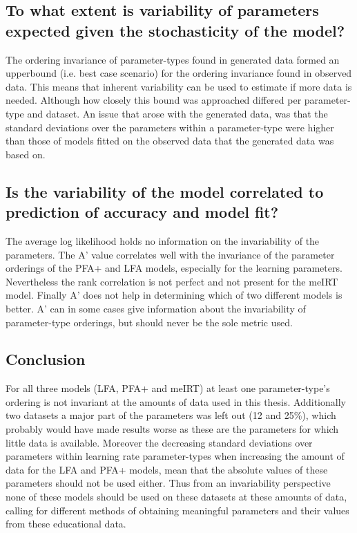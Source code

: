 \documentclass{scrartcl}
\begin{document}
\subsection{To what extent is variability of parameters expected given the stochasticity of the model?}
The ordering invariance of parameter-types found in generated data formed an upperbound (i.e. best case scenario) for the ordering invariance found in observed data. This means that inherent variability can be used to estimate if more data is needed. Although how closely this bound was approached differed per parameter-type and dataset. An issue that arose with the generated data, was that the standard deviations over the parameters within a parameter-type were higher than those of models fitted on the observed data that the generated data was based on. 

\subsection{Is the variability of the model correlated to prediction of accuracy and model fit?}
The average log likelihood holds no information on the invariability of the parameters. The A' value correlates well with the invariance of the parameter orderings of the PFA+ and LFA models, especially for the learning parameters. Nevertheless the rank correlation is not perfect and not present for the meIRT model. Finally A' does not help in determining which of two different models is better. A' can in some cases give information about the invariability of parameter-type orderings, but should never be the sole metric used.

\subsection{Conclusion}
For all three models (LFA, PFA+ and meIRT) at least one parameter-type's ordering is not invariant at the amounts of data used in this thesis. Additionally two datasets a major part of the parameters was left out (12 and 25\%), which probably would have made results worse as these are the parameters for which little data is available. Moreover the decreasing standard deviations over parameters within learning rate parameter-types when increasing the amount of data for the LFA and PFA+ models, mean that the absolute values of these parameters should not be used either. Thus from an invariability perspective none of these models should be used on these datasets at these amounts of data, calling for different methods of obtaining meaningful parameters and their values from these educational data.    
\end{document}
